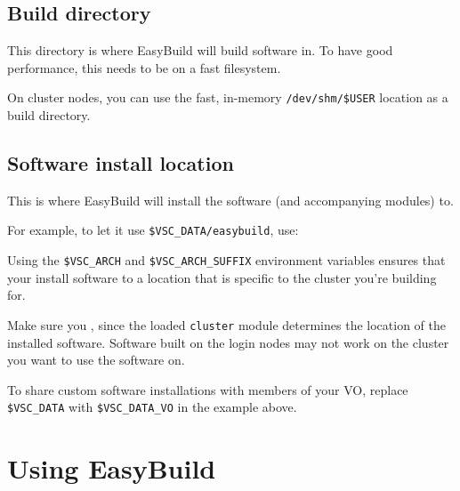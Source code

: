 \begin{prompt}
\end{prompt}

\subsection{Build directory}

This directory is where EasyBuild will build software in. To have good performance,
this needs to be on a fast filesystem.

\begin{prompt}
\end{prompt}

On cluster nodes, you can use the fast, in-memory \lstinline|/dev/shm/$USER| location
as a build directory.

\subsection{Software install location}

This is where EasyBuild will install the software (and accompanying modules) to.

For example, to let it use \lstinline|$VSC_DATA/easybuild|, use:



\begin{prompt}
\end{prompt}

Using the \lstinline|$VSC_ARCH| and \lstinline|$VSC_ARCH_SUFFIX| environment variables
ensures that your install software to a location that is specific to the cluster you're
building for.

Make sure you , since the loaded \lstinline|cluster|
module determines the location of the installed software. Software built on the login
nodes may not work on the cluster you want to use the software on.

To share custom software installations with members of your VO, replace \lstinline|$VSC_DATA|
with \lstinline|$VSC_DATA_VO| in the example above.

\section{Using EasyBuild}

